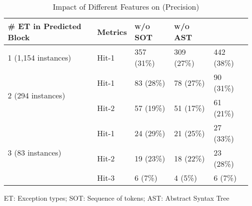 \begin{table}[t]
	\caption{Impact of Different Features on {\xtype} (Precision)}
	\vspace{-10pt}
	\tabcolsep 2pt
	{\small
		\begin{center}
			\renewcommand{\arraystretch}{1}
			\begin{tabular}{p{2cm}<{\centering}|p{1cm}<{\centering}|p{1.5cm}<{\centering}|p{1.5cm}<{\centering}|p{1.5cm}<{\centering}}
				\hline
				\# ET in Predicted \code{Try-Catch} Block & Metrics &{\textsc{\tool w/o SOT}\xspace}&{\textsc{\tool w/o AST}\xspace}& {\textsc{\tool}\xspace} \\
				\hline
				\multirow{1}{*}{1 (1,154 instances)}   & Hit-1  &357 (31\%)& 309 (27\%)& 442 (38\%) \\
				\hline
				\multirow{2}{*}{2 (294 instances)}  & Hit-1   &83 (28\%)& 78 (27\%)& 90 (31\%) \\
				& Hit-2       						&57 (19\%)& 51 (17\%)& 61 (21\%) \\
				\hline
				\multirow{3}{*}{3 (83 instances)}  & Hit-1    & 24 (29\%)& 21 (25\%)& 27 (33\%) \\
				& Hit-2         					&19 (23\%)& 18 (22\%)& 23 (28\%)\\
				& Hit-3         				  	&6 (7\%)& 4 (5\%)& 6 (7\%) \\
				\hline
			\end{tabular}
		ET: Exception types; SOT: Sequence of tokens; AST: Abstract Syntax Tree
			\label{tab:sensi-xtype-precision}
		\end{center}
	}
\end{table}



